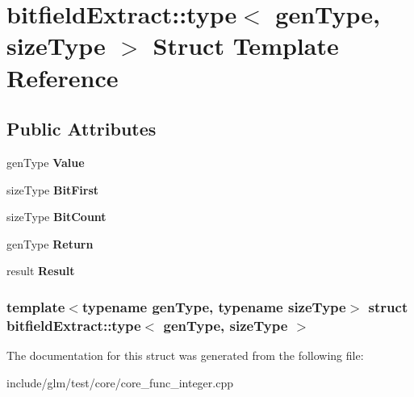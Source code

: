 \hypertarget{structbitfieldExtract_1_1type}{\section{bitfield\-Extract\-:\-:type$<$ gen\-Type, size\-Type $>$ \-Struct \-Template \-Reference}
\label{structbitfieldExtract_1_1type}
}
\subsection*{\-Public \-Attributes}
\begin{DoxyCompactItemize}
\item 
\hypertarget{structbitfieldExtract_1_1type_af4fd4f46ff8b116130b37a051aaa598d}{gen\-Type {\bfseries \-Value}}\label{structbitfieldExtract_1_1type_af4fd4f46ff8b116130b37a051aaa598d}

\item 
\hypertarget{structbitfieldExtract_1_1type_ad7c3d9e9ebf19f8ee1ecc7e60745aa9b}{size\-Type {\bfseries \-Bit\-First}}\label{structbitfieldExtract_1_1type_ad7c3d9e9ebf19f8ee1ecc7e60745aa9b}

\item 
\hypertarget{structbitfieldExtract_1_1type_a828b70aa82932f2038717998c8ef426a}{size\-Type {\bfseries \-Bit\-Count}}\label{structbitfieldExtract_1_1type_a828b70aa82932f2038717998c8ef426a}

\item 
\hypertarget{structbitfieldExtract_1_1type_a5bc34365862d6efbf20553463287681d}{gen\-Type {\bfseries \-Return}}\label{structbitfieldExtract_1_1type_a5bc34365862d6efbf20553463287681d}

\item 
\hypertarget{structbitfieldExtract_1_1type_af7e65bb0050cec27201495de1c8cd253}{result {\bfseries \-Result}}\label{structbitfieldExtract_1_1type_af7e65bb0050cec27201495de1c8cd253}

\end{DoxyCompactItemize}
\subsubsection*{template$<$typename gen\-Type, typename size\-Type$>$ struct bitfield\-Extract\-::type$<$ gen\-Type, size\-Type $>$}



\-The documentation for this struct was generated from the following file\-:\begin{DoxyCompactItemize}
\item 
include/glm/test/core/core\-\_\-func\-\_\-integer.\-cpp\end{DoxyCompactItemize}
